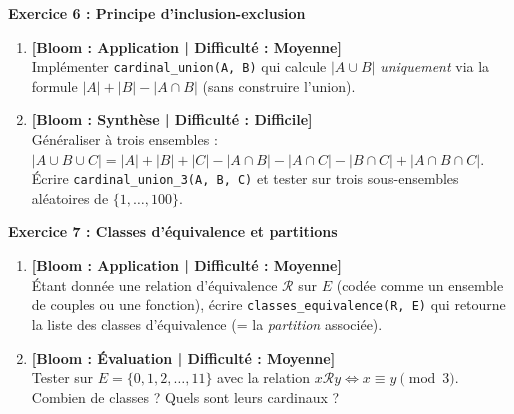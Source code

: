 \vspace{0.3cm}

\noindent\textbf{Exercice 6 : Principe d'inclusion-exclusion}
\begin{enumerate}
    \item \textbf{[Bloom : Application | Difficulté : Moyenne]} \\
    Implémenter \texttt{cardinal\_union(A, B)} qui calcule $|A \cup B|$ \emph{uniquement} via la formule $|A| + |B| - |A \cap B|$ (sans construire l'union).
    \item \textbf{[Bloom : Synthèse | Difficulté : Difficile]} \\
    Généraliser à trois ensembles : $|A \cup B \cup C| = |A| + |B| + |C| - |A \cap B| - |A \cap C| - |B \cap C| + |A \cap B \cap C|$. Écrire \texttt{cardinal\_union\_3(A, B, C)} et tester sur trois sous-ensembles aléatoires de $\{1, \dots, 100\}$.
\end{enumerate}

\vspace{0.3cm}

\noindent\textbf{Exercice 7 : Classes d'équivalence et partitions}
\begin{enumerate}
    \item \textbf{[Bloom : Application | Difficulté : Moyenne]} \\
    Étant donnée une relation d'équivalence $\mathcal{R}$ sur $E$ (codée comme un ensemble de couples ou une fonction), écrire \texttt{classes\_equivalence(R, E)} qui retourne la liste des classes d'équivalence (= la \emph{partition} associée).
    \item \textbf{[Bloom : Évaluation | Difficulté : Moyenne]} \\
    Tester sur $E = \{0, 1, 2, \dots, 11\}$ avec la relation $x \mathcal{R} y \iff x \equiv y \pmod{3}$. Combien de classes ? Quels sont leurs cardinaux ?
\end{enumerate}

\vspace{0.3cm}

